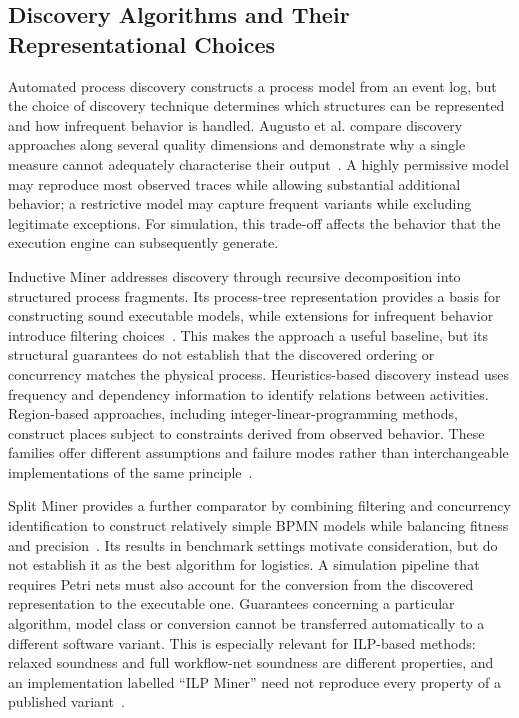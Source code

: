 \subsection{Discovery Algorithms and Their Representational Choices}

Automated process discovery constructs a process model from an event log, but the choice of discovery technique determines which structures can be represented and how infrequent behavior is handled. Augusto et al. compare discovery approaches along several quality dimensions and demonstrate why a single measure cannot adequately characterise their output~\cite{DiscoveryBenchmark}. A highly permissive model may reproduce most observed traces while allowing substantial additional behavior; a restrictive model may capture frequent variants while excluding legitimate exceptions. For simulation, this trade-off affects the behavior that the execution engine can subsequently generate.

Inductive Miner addresses discovery through recursive decomposition into structured process fragments. Its process-tree representation provides a basis for constructing sound executable models, while extensions for infrequent behavior introduce filtering choices~\cite{Leemans2014InductiveMiner}. This makes the approach a useful baseline, but its structural guarantees do not establish that the discovered ordering or concurrency matches the physical process. Heuristics-based discovery instead uses frequency and dependency information to identify relations between activities. Region-based approaches, including integer-linear-programming methods, construct places subject to constraints derived from observed behavior. These families offer different assumptions and failure modes rather than interchangeable implementations of the same principle~\cite{DiscoveryBenchmark,RWVanZelst2018ILP}.

Split Miner provides a further comparator by combining filtering and concurrency identification to construct relatively simple BPMN models while balancing fitness and precision~\cite{RWSplitMiner2019}. Its results in benchmark settings motivate consideration, but do not establish it as the best algorithm for logistics. A simulation pipeline that requires Petri nets must also account for the conversion from the discovered representation to the executable one. Guarantees concerning a particular algorithm, model class or conversion cannot be transferred automatically to a different software variant. This is especially relevant for ILP-based methods: relaxed soundness and full workflow-net soundness are different properties, and an implementation labelled ``ILP Miner'' need not reproduce every property of a published variant~\cite{RWVanZelst2018ILP}.

